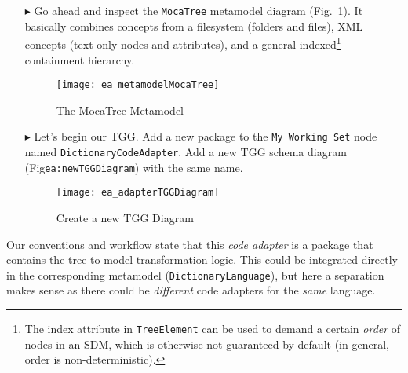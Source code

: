\begin{itemize}

\item[$\blacktriangleright$] Go ahead and inspect the \texttt{MocaTree} metamodel diagram (Fig.~\ref{ea:mocaTree}). It basically combines concepts from a
filesystem (folders and files), XML concepts (text-only nodes and attributes), and a general indexed\footnote{The index attribute in \texttt{TreeElement} can be used to
demand a certain \emph{order} of nodes in an SDM, which is otherwise not guaranteed by default (in general, order is non-deterministic).} containment
hierarchy.

\begin{figure}[htpb]
\begin{center}
  \texttt{[image: ea\_metamodelMocaTree]}
  \caption{The MocaTree Metamodel}
  \label{ea:mocaTree}
\end{center}
\end{figure}

\item[$\blacktriangleright$] Let's begin our TGG. Add a new package to the \texttt{My Working Set} node named \texttt{Dict\-ion\-ary\-Code\-Adap\-ter}. Add a
new TGG schema diagram (Fig\texttt{ea:newTGGDiagram}) with the same name.

\begin{figure}[htpb]
\begin{center}
  \texttt{[image: ea\_adapterTGGDiagram]}
  \caption{Create a new TGG Diagram}
  \label{ea:newTGGDiagram}
\end{center}
\end{figure}

\end{itemize}

Our conventions and workflow state that this \emph{code adapter} is a package that contains the tree-to-model transformation logic. This could be integrated
directly in the corresponding metamodel (\texttt{Dic\-tion\-ary\-Language}), but here a separation makes sense as there could be \emph{different} code adapters
for the \emph{same} language.

